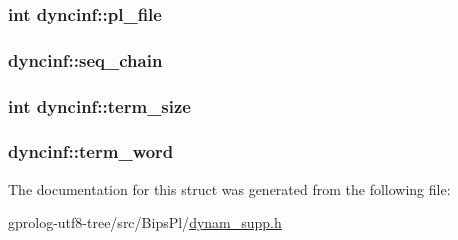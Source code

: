 \subsubsection[{\texorpdfstring{pl\+\_\+file}{pl_file}}]{\setlength{\rightskip}{0pt plus 5cm}int dyncinf\+::pl\+\_\+file}\hypertarget{structdyncinf_a8eb75fc2f5558e0fe27a7307dda56f2e}{}\label{structdyncinf_a8eb75fc2f5558e0fe27a7307dda56f2e}
\subsubsection[{\texorpdfstring{seq\+\_\+chain}{seq_chain}}]{ dyncinf\+::seq\+\_\+chain}\hypertarget{structdyncinf_a7761fb1d761320cf1779e333348690a1}{}\label{structdyncinf_a7761fb1d761320cf1779e333348690a1}
\subsubsection[{\texorpdfstring{term\+\_\+size}{term_size}}]{\setlength{\rightskip}{0pt plus 5cm}int dyncinf\+::term\+\_\+size}\hypertarget{structdyncinf_a4b49c8e104c686701eb19ca0d01173e7}{}\label{structdyncinf_a4b49c8e104c686701eb19ca0d01173e7}
\subsubsection[{\texorpdfstring{term\+\_\+word}{term_word}}]{ dyncinf\+::term\+\_\+word}\hypertarget{structdyncinf_aad9f2ad962d3ca3002a6fc97dc375d0b}{}\label{structdyncinf_aad9f2ad962d3ca3002a6fc97dc375d0b}


The documentation for this struct was generated from the following file\+:\begin{DoxyCompactItemize}
\item 
gprolog-\/utf8-\/tree/src/\+Bips\+Pl/\hyperlink{dynam__supp_8h}{dynam\+\_\+supp.\+h}\end{DoxyCompactItemize}
